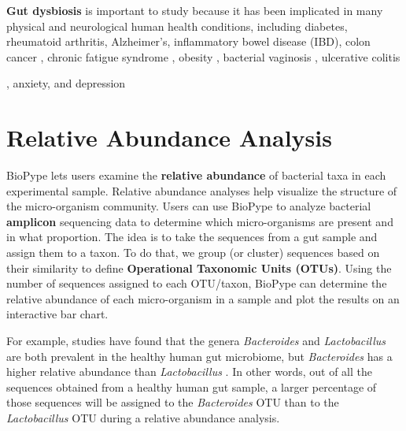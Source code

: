  \textbf{Gut dysbiosis} is important to study because it has been implicated in many physical and neurological human health conditions, including diabetes, rheumatoid arthritis, Alzheimer's, inflammatory bowel disease (IBD), colon cancer \citep{Buford2017, Kennedy2014, Castellarin2012},  chronic fatigue syndrome \citep{Lakhan2010}, obesity \citep{Turnbaugh2006,Turnbaugh2009}, bacterial vaginosis \citep{Africa2014}, ulcerative colitis {\citep{Mandal2015, Matsuoka2015}, anxiety, and depression \citep{Evrensel2015, Lach2018}
%
\section{Relative Abundance Analysis}
%
%
BioPype lets users examine the \textbf{relative abundance} of bacterial taxa in each experimental sample. Relative abundance analyses help visualize the structure of the micro-organism community. Users can use BioPype to analyze bacterial \textbf{amplicon} sequencing data to determine which micro-organisms are present and in what proportion.
%
%
The idea is to take the sequences from a gut sample and assign them to a taxon. To do that, we group (or cluster) sequences based on their similarity to define \textbf{Operational Taxonomic Units (OTUs)}. 
%
%
Using the number of sequences assigned to each OTU/taxon, BioPype can determine the relative abundance of each micro-organism in a sample and plot the results on an interactive bar chart.

For example, studies have found that the genera \textit{Bacteroides} and \textit{Lactobacillus} are both prevalent in the healthy human gut microbiome, but \textit{Bacteroides} has a higher relative abundance than \textit{Lactobacillus} \cite{Lloyd-Price2016}. In other words, out of all the sequences obtained from a healthy human gut sample, a larger percentage of those sequences will be assigned to the \textit{Bacteroides} OTU than to the \textit{Lactobacillus} OTU during a relative abundance analysis. 

}
